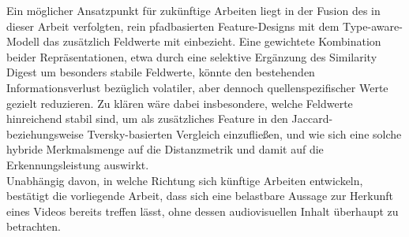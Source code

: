 Ein möglicher Ansatzpunkt für zukünftige Arbeiten liegt in der Fusion des in dieser Arbeit verfolgten, rein pfadbasierten Feature-Designs mit dem Type-aware-Modell das zusätzlich Feldwerte mit einbezieht. Eine gewichtete Kombination beider Repräsentationen, etwa durch eine selektive Ergänzung des Similarity Digest um besonders stabile Feldwerte, könnte den bestehenden Informationsverlust bezüglich volatiler, aber dennoch quellenspezifischer Werte gezielt reduzieren. Zu klären wäre dabei insbesondere, welche Feldwerte hinreichend stabil sind, um als zusätzliches Feature in den Jaccard- beziehungsweise Tversky-basierten Vergleich einzufließen, und wie sich eine solche hybride Merkmalsmenge auf die Distanzmetrik und damit auf die Erkennungsleistung auswirkt.\\

Unabhängig davon, in welche Richtung sich künftige Arbeiten entwickeln, bestätigt die vorliegende Arbeit, dass sich eine belastbare Aussage zur Herkunft eines Videos bereits treffen lässt, ohne dessen audiovisuellen Inhalt überhaupt zu betrachten.